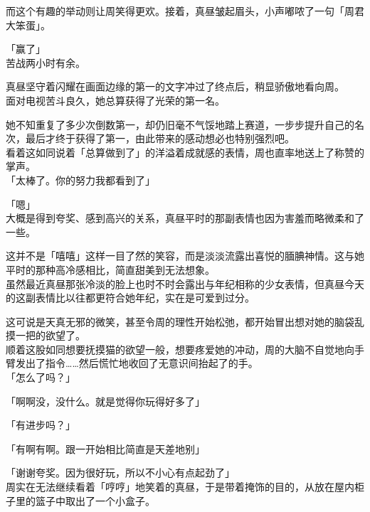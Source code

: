 而这个有趣的举动则让周笑得更欢。接着，真昼皱起眉头，小声嘟哝了一句「周君大笨蛋」。\\

\vspace{2\baselineskip}

「赢了」\\

苦战两小时有余。

真昼坚守着闪耀在画面边缘的第一的文字冲过了终点后，稍显骄傲地看向周。\\

面对电视苦斗良久，她总算获得了光荣的第一名。

她不知重复了多少次倒数第一，却仍旧毫不气馁地踏上赛道，一步步提升自己的名次，最后才终于获得了第一，由此带来的感动想必也特别强烈吧。\\

看着这如同说着「总算做到了」的洋溢着成就感的表情，周也直率地送上了称赞的掌声。\\

「太棒了。你的努力我都看到了」

「嗯」\\

大概是得到夸奖、感到高兴的关系，真昼平时的那副表情也因为害羞而略微柔和了一些。

这并不是「嘻嘻」这样一目了然的笑容，而是淡淡流露出喜悦的腼腆神情。这与她平时的那种高冷感相比，简直甜美到无法想象。\\

虽然最近真昼那张冷淡的脸上也时不时会露出与年纪相称的少女表情，但真昼今天的这副表情比以往都更符合她年纪，实在是可爱到过分。

这可说是天真无邪的微笑，甚至令周的理性开始松弛，都开始冒出想对她的脑袋乱摸一把的欲望了。\\

顺着这股如同想要抚摸猫的欲望一般，想要疼爱她的冲动，周的大脑不自觉地向手臂发出了指令……然后慌忙地收回了无意识间抬起了的手。\\

「怎么了吗？」

「啊啊没，没什么。就是觉得你玩得好多了」

「有进步吗？」

「有啊有啊。跟一开始相比简直是天差地别」

「谢谢夸奖。因为很好玩，所以不小心有点起劲了」\\

周实在无法继续看着「哼哼」地笑着的真昼，于是带着掩饰的目的，从放在屋内柜子里的篮子中取出了一个小盒子。\\

